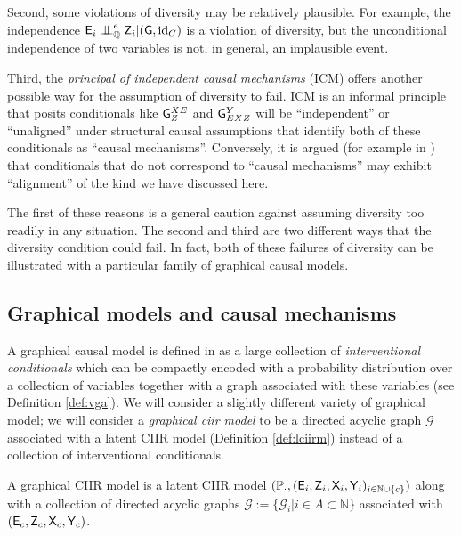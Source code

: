 Second, some violations of diversity may be relatively plausible. For example, the independence $\RV{E}_i\CI^e_\prob{Q} \RV{Z}_i |(\RV{G},\mathrm{id}_C)$ is a violation of diversity, but the unconditional independence of two variables is not, in general, an implausible event.

Third, the \emph{principal of independent causal mechanisms} (ICM) offers another possible way for the assumption of diversity to fail\citep{lemeire_replacing_2013,peters_elements_2017}. ICM is an informal principle that posits conditionals like $\mathsf{G}^{XE}_Z$ and $\mathsf{G}^{Y}_{EXZ}$ will be ``independent'' or ``unaligned'' under structural causal assumptions that identify both of these conditionals as ``causal mechanisms''. Conversely, it is argued (for example in \citet[Ch. ~2]{peters_elements_2017}) that conditionals that do not correspond to ``causal mechanisms'' may exhibit ``alignment'' of the kind we have discussed here.

The first of these reasons is a general caution against assuming diversity too readily in any situation. The second and third are two different ways that the diversity condition could fail. In fact, both of these failures of diversity can be illustrated with a particular family of graphical causal models.

\subsection{Graphical models and causal mechanisms}

A graphical causal model is defined in \citet[Ch. ~1]{pearl_causality:_2009} as a large collection of \emph{interventional conditionals} which can be compactly encoded with a probability distribution over a collection of variables together with a graph associated with these variables (see Definition \ref{def:vga}). We will consider a slightly different variety of graphical model; we will consider a \emph{graphical ciir model} to be a directed acyclic graph $\mathcal{G}$ associated with a latent CIIR model (Definition \ref{def:lciirm}) instead of a collection of interventional conditionals.

\begin{definition}
A graphical CIIR model is a latent CIIR model $(\mathbb{P}_\cdot,(\mathsf{E}_i,\mathsf{Z}_{i},\mathsf{X}_i,\mathsf{Y}_i)_{i\in \mathbb{N}\cup\{c\}})$ along with a collection of directed acyclic graphs $\mathscr{G}:=\{\mathcal{G}_i|i\in A\subset\mathbb{N}\}$ associated with $(\mathsf{E}_c, \mathsf{Z}_c,\mathsf{X}_c,\mathsf{Y}_c)$.
\end{definition}

